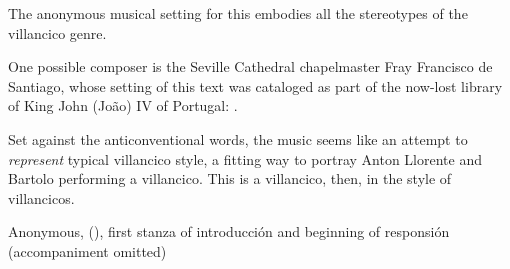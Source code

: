 
The anonymous musical setting for this embodies all the stereotypes of the
villancico genre.%
\begin{Footnote}
    One possible composer is the Seville Cathedral chapelmaster Fray Francisco
    de Santiago, whose setting of this text was cataloged as part of the
    now-lost library of King John (João) IV of Portugal:
    \autocite[caixão 26, ]{JohnIV:Catalog}.
\end{Footnote}
Set against the anticonventional words, the music seems like an attempt to
\emph{represent} typical villancico style, a fitting way to portray Anton
Llorente and Bartolo performing a villancico.
This is a villancico, then, in the style of villancicos.


\begin{musicexample}
    \caption{Anonymous, 
    (), first stanza of introducción and beginning of
    responsión (accompaniment omitted)} 
    \label{mus:Anton_Llorente}
\end{musicexample}

